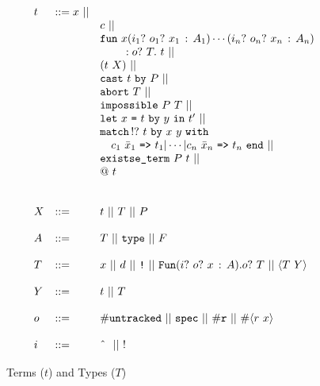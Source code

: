 \documentclass[9pt,natbib]{sigplanconf}
\newcommand{\Eq}[0]{\texttt{=}}
\newcommand{\bang}[0]{\texttt{!}}
\begin{document}
\begin{figure}
\[
\begin{array}{lll}
t & ::= x\ ||\\
\ & \ &   c\ ||\\ 
\ & \ &    \texttt{fun}\ x(i_1?\ o_1?\ x_1\,:\,A_1)\cdots(i_n?\ o_n?\ x_n\,:\, A_n)\\
\ & \ & \ \ \ \ \ \ \  : o?\ T .\ t\ ||\\
\ & \ &    (t\ X)\ || \\ 
\ & \ &         \texttt{cast}\ t\ \texttt{by}\ P  \ ||\\
\ & \ &  \texttt{abort}\ T\ ||\\ 
\ & \ &  \texttt{impossible}\ P\ T\ ||\\ 
\ & \ &  \texttt{let}\ x\ \Eq\ t\ \texttt{by}\ y\ \texttt{in}\ t' \ ||\ 
\\ 
\ & \ &  \texttt{match}\, !?\ t\ \texttt{by}\ x\ y \ \texttt{with}\\
\ & \ &  \ \ \ c_1\ \bar{x}_1\ \texttt{=>}\ t_1 |
 \cdots | c_n\ \bar{x}_n\ \texttt{=>}\ t_n\ \texttt{end}\ ||\\
\ & \ &  \texttt{existse\_term}\ P\ t\ || \\
\ & \ &  @\ t \\
\\
\\
X & ::= & t\ ||\ T\ ||\ P
\\
\\
A & ::= & T\ ||\ \texttt{type}\ ||\ F 
\\
\\
T & ::= & x\ ||\ d\ ||\ \bang\ ||\ 
     \texttt{Fun}(i?\ o?\ x\,:\,A) . o?\ T\ ||\ \langle T\ Y\rangle 
\\
\\
Y & ::= & t\ ||\ T
\\
\\
o & ::= & \#\texttt{untracked}\ ||\ \texttt{spec}\ ||\ \#\texttt{r}\ ||\ \#\langle r\ x\rangle
\\
\\
i & ::= & \textnormal{\^{\ }}\ ||\ !\ 
\end{array}
\]
\caption{\label{fig:terms} Terms ($t$) and Types ($T$)}
\end{figure}
\end{document}
